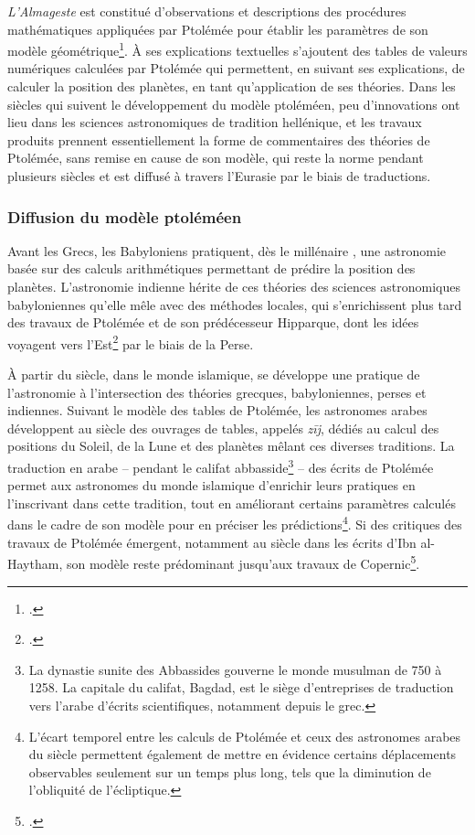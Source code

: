 \textit{L'Almageste} est constitué d'observations et descriptions des procédures mathématiques appliquées par Ptolémée pour établir les paramètres de son modèle géométrique\footcite{evansHistoryAstronomy}. À ses explications textuelles s'ajoutent des tables de valeurs numériques calculées par Ptolémée qui permettent, en suivant ses explications, de calculer la position des planètes, en tant qu'application de ses théories. Dans les siècles qui suivent le développement du modèle ptoléméen, peu d'innovations ont lieu dans les sciences astronomiques de tradition hellénique, et les travaux produits prennent essentiellement la forme de commentaires des théories de Ptolémée, sans remise en cause de son modèle, qui reste la norme pendant plusieurs siècles et est diffusé à travers l'Eurasie par le biais de traductions.

    \subsubsection{Diffusion du modèle ptoléméen}
Avant les Grecs, les Babyloniens pratiquent, dès le \ist millénaire \jc, une astronomie basée sur des calculs arithmétiques permettant de prédire la position des planètes. L'astronomie indienne hérite de ces théories des sciences astronomiques babyloniennes qu'elle mêle avec des méthodes locales, qui s'enrichissent plus tard des travaux de Ptolémée et de son prédécesseur Hipparque, dont les idées voyagent vers l'Est\footcite{evansHistoryAstronomy} par le biais de la Perse.

À partir du \viii siècle, dans le monde islamique, se développe une pratique de l'astronomie à l'intersection des théories grecques, babyloniennes, perses et indiennes. Suivant le modèle des tables de Ptolémée, les astronomes arabes développent au \ix siècle des ouvrages de tables, appelés \textit{zīj}, dédiés au calcul des positions du Soleil, de la Lune et des planètes mêlant ces diverses traditions. La traduction en arabe -- pendant le califat abbasside\footnote{La dynastie sunite des Abbassides gouverne le monde musulman de 750 à 1258. La capitale du califat, Bagdad, est le siège d'entreprises de traduction vers l'arabe d'écrits scientifiques, notamment depuis le grec.} -- des écrits de Ptolémée permet aux astronomes du monde islamique d'enrichir leurs pratiques en l'inscrivant dans cette tradition, tout en améliorant certains paramètres calculés dans le cadre de son modèle pour en préciser les prédictions\footnote{L'écart temporel entre les calculs de Ptolémée et ceux des astronomes arabes du \ix siècle permettent également de mettre en évidence certains déplacements observables seulement sur un temps plus long, tels que la diminution de l'obliquité de l'écliptique.}. Si des critiques des travaux de Ptolémée émergent, notamment au \xie siècle dans les écrits d'Ibn al-Haytham, son modèle reste prédominant jusqu'aux travaux de Copernic\footcite{evansHistoryAstronomy}.

